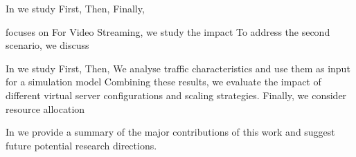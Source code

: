 In  we study
First,
Then,
Finally,

 focuses on
For Video Streaming, we study the impact
To address the second scenario, we discuss

In  we study
First,
Then,
We analyse traffic characteristics and use them as input for a simulation model
Combining these results, we evaluate the impact of different virtual server configurations and scaling strategies.
Finally, we consider resource allocation

In  we provide a summary of the major contributions of this work and suggest future potential research directions.

